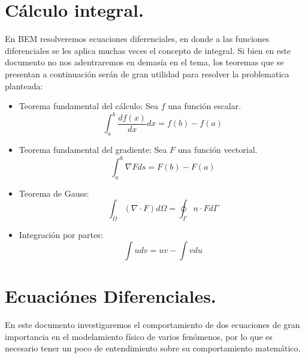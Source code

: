 \section{Cálculo integral.}\label{sec:Calculo integral.}
\setcounter{figure}{0}
\setcounter{equation}{0}
En BEM resolveremos ecuaciones diferenciales, en donde a las funciones diferenciales se les aplica muchas veces el concepto de integral. Si bien en este documento no nos adentraremos en demasía en el tema, los teoremas que se presentan a continuación serán de gran utilidad para resolver la problematica planteada:
\begin{itemize}
\item Teorema fundamental del cálculo: Sea $f$ una función escalar.
\begin{equation}
\label{eq:Teorema fundamental del calculo}
\int^b_a \frac{df(x)}{dx}dx=f(b)-f(a)
\end{equation}
\item Teorema fundamental del gradiente: Sea $F$ una función vectorial.
\begin{equation}
\label{eq:Teorema fundamental del gradiente}
\int^b_a \nabla F ds=F(b)-F(a)
\end{equation}
\item Teorema de Gauss:
\begin{equation}
\label{eq:Teorema de Gauss}
\int_\Omega(\nabla\cdot F)d\Omega=\oint_\Gamma n\cdot F d\Gamma
\end{equation}
\item Integración por partes:
\begin{equation}
\label{eq:Integracion por partes}
\int u dv=uv-\int v du
\end{equation}
\end{itemize}
\section{Ecuaciónes Diferenciales.}\label{sec:Ecuaciones Diferenciales.}
En este documento investigaremos el comportamiento de dos ecuaciones de gran importancia en el modelamiento físico de varios fenómenos, por lo que es necesario tener un poco de entendimiento sobre su comportamiento matemático.

